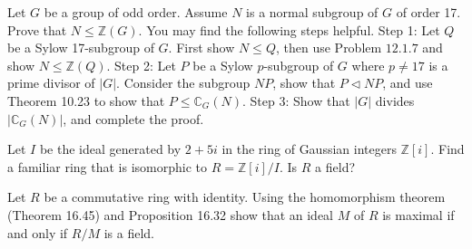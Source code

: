 \documentclass[12pt,letterpaper,boxed]{hmcpset}
\begin{document}

\begin{problem}[12.3.22]
Let $G$ be a group of odd order. Assume $N$ is a normal subgroup of $G$ of order 17. Prove that $N \leq \mathbb{Z}(G)$.
\newline You may find the following steps helpful.
\newline
Step 1: Let $Q$ be a Sylow 17-subgroup of $G$. First show $N \leq Q$, then use Problem $\textit{12.1.7}$ and show $N \leq \mathbb{Z}(Q)$.
\newline
Step 2: Let $P$ be a Sylow $p$-subgroup of $G$ where $p \neq 17$ is a prime divisor of $\vert G \vert$. Consider the subgroup $NP$, show that $P \triangleleft NP$, and use Theorem 10.23 to show that $P \leq \mathbb{C}_G(N)$.
\newline
Step 3: Show that $\vert G \vert$ divides $\vert \mathbb{C}_G(N) \vert$, and complete the proof.
\end{problem}

\begin{solution}
\end{solution}

\clearpage

\begin{problem}[16.2.8]
Let $I$ be the ideal generated by $2+5i$ in the ring of Gaussian integers $\mathbb{Z}[i]$. Find a familiar ring that is isomorphic to $R = \mathbb{Z}[i]/I$. Is $R$ a field?
\end{problem}

\begin{solution}
\end{solution}

\clearpage

\begin{problem}[16.2.9]
Let $R$ be a commutative ring with identity. Using the homomorphism theorem (Theorem 16.45) and Proposition 16.32 show that an ideal $M$ of $R$ is maximal if and only if $R/M$ is a field. 
\end{problem}

\begin{solution}
\end{solution}

\clearpage
\end{document}
